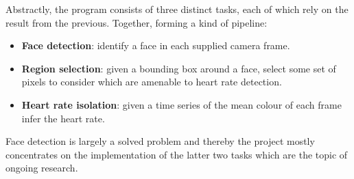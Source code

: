 Abstractly, the program consists of three distinct tasks, each of which rely on the result from the previous. Together, forming a kind of pipeline:
\begin{itemize}
    \item \textbf{Face detection}: identify a face in each supplied camera frame.
    \item \textbf{Region selection}: given a bounding box around a face, select some set of pixels to consider which are amenable to heart rate detection.
    \item \textbf{Heart rate isolation}: given a time series of the mean colour of each frame infer the heart rate.
\end{itemize}
Face detection is largely a solved problem and thereby the project mostly concentrates
on the implementation of the latter two tasks which are the topic of ongoing research.


